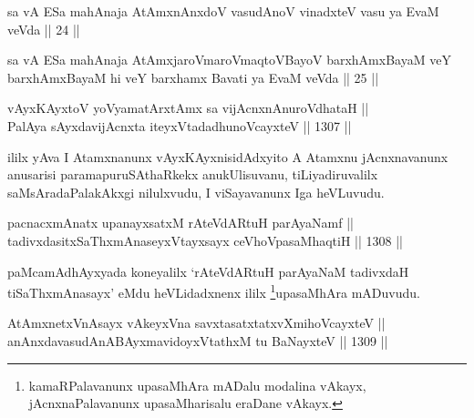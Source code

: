 
\begin{kandikeshl}
sa vA ESa mahAnaja AtAmxnAnxdoV vasudAnoV vinadxteV vasu ya EvaM veVda || 24 ||
\end{kandikeshl}

\begin{kandikeshl}
sa vA ESa mahAnaja AtAmxjaroV\s maroV\s maqtoV\s BayoV barxhAmxBayaM veY barxhAmxBayaM hi veY barxhamx Bavati ya EvaM veVda || 25 ||
\end{kandikeshl}

\begin{shl}
vAyxKAyxtoV yoV\s yamatArx\s \s tAmx sa vijAcnxnAnuroVdhataH || \\
PalAya sAyxdavijAcnxta iteyxVtadadhunoVcayxteV \hfill || 1307 ||  
\end{shl}

\begin{artha}
ililx yAva I Atamxnanunx vAyxKAyxnisidAdxyito A Atamxnu jAcnxnavanunx anusarisi paramapuruSAthaRkekx anukUlisuvanu, tiLiyadiruvalilx saMsAradaPalakAkxgi nilulxvudu, I viSayavanunx Iga heVLuvudu.
\end{artha}


\begin{shl}
pacnacxmAnatx upanayxsatxM rAteVdARtuH parAyaNamf || \\
tadivxdasitxSaThxmAnaseyxVtayxsayx ceVhoVpasaMhaqtiH \hfill || 1308 ||  
\end{shl}

\begin{artha}
paMcamAdhAyxyada koneyalilx `rAteVdARtuH parAyaNaM tadivxdaH tiSaThxmAnasayx' eMdu heVLidadxnenx ililx \footnote{kamaRPalavanunx upasaMhAra mADalu modalina vAkayx, jAcnxnaPalavanunx upasaMharisalu eraDane vAkayx.}upasaMhAra mADuvudu.
\end{artha}


\begin{shl}
AtAmxnetxVnAsayx vAkeyxVna savxtasatxtatxvXmihoVcayxteV || \\
anAnxdavasudAnABAyxmavidoyxVtathxM tu BaNayxteV \hfill || 1309 ||  
\end{shl}

